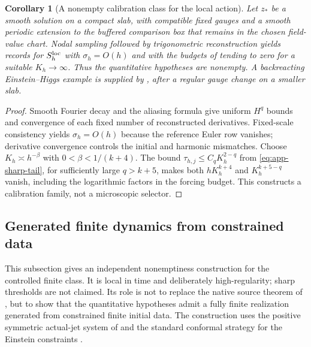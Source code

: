 \documentclass[11pt]{article}
\numberwithin{equation}{section}
\newtheorem{corollary}[corollary]{Corollary}
\theoremstyle{definition}
\theoremstyle{remark}
\begin{document}
\begin{corollary}[A nonempty calibration class for the local action]
\label{cor:local-calibration-nonempty}
Let $z_*$ be a smooth solution on a compact slab, with compatible fixed
gauges and a smooth periodic extension to the buffered comparison box that
remains in the chosen field-value chart.  Nodal sampling followed by
trigonometric reconstruction yields records for $S_h^{\rm loc}$ with
$\sigma_h=O(h)$ and with the budgets of  tending
to zero for a suitable $K_h\to\infty$.  Thus the quantitative hypotheses
are nonempty.  A backreacting Einstein--Higgs example is supplied by
, after a regular gauge change on a smaller slab.
\end{corollary}
\begin{proof}
Smooth Fourier decay and the aliasing formula give uniform $H^q$ bounds
and convergence of each fixed number of reconstructed derivatives.
Fixed-scale consistency yields $\sigma_h=O(h)$ because the reference Euler
row vanishes; derivative convergence controls the initial and harmonic
mismatches. Choose $K_h\asymp h^{-\beta}$ with
$0<\beta<1/(k+4)$. The bound
$\tau_{h,j}\le C_qK_h^{2-q}$ from \eqref{eq:app-sharp-tail}, for
sufficiently large $q>k+5$, makes both $hK_h^{k+4}$ and
$K_h^{k+5-q}$ vanish, including the logarithmic factors in the forcing
budget. This constructs a calibration family, not a microscopic selector.
\end{proof}

\subsection{Generated finite dynamics from constrained data}
\label{app:generated-dynamics}

This subsection gives an independent nonemptiness construction for the controlled finite class.  It is local in time and deliberately high-regularity; sharp thresholds are not claimed.  Its role is not to replace the native source theorem of , but to show that the quantitative hypotheses admit a fully finite realization generated from constrained finite initial data.  The construction uses the positive symmetric actual-jet system of  and the standard conformal strategy for the Einstein constraints \cite{ChoquetBruhatIsenbergPollack2007,IsenbergMaxwell2025}.
\end{document}
